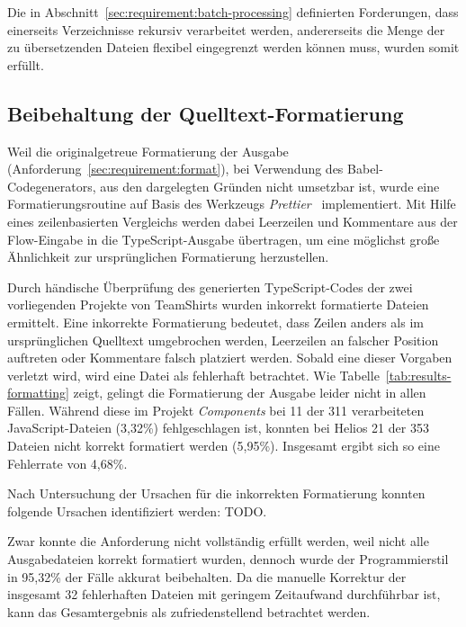 Die in Abschnitt~\ref{sec:requirement:batch-processing} definierten Forderungen, dass einerseits Verzeichnisse rekursiv verarbeitet werden, andererseits die Menge der zu übersetzenden Dateien flexibel eingegrenzt werden können muss, wurden somit erfüllt.

\subsection{Beibehaltung der Quelltext-Formatierung}

Weil die originalgetreue Formatierung der Ausgabe (Anforderung~\ref{sec:requirement:format}), bei Verwendung des Babel-Codegenerators, aus den dargelegten Gründen nicht umsetzbar ist, wurde eine Formatierungsroutine auf Basis des Werkzeugs \textit{Prettier}~\autocite{SOFTWARE:PRETTIER} implementiert. Mit Hilfe eines zeilenbasierten Vergleichs werden dabei Leerzeilen und Kommentare aus der Flow-Eingabe in die TypeScript-Ausgabe übertragen, um eine möglichst große Ähnlichkeit zur ursprünglichen Formatierung herzustellen.

Durch händische Überprüfung des generierten TypeScript-Codes der zwei vorliegenden Projekte von TeamShirts wurden inkorrekt formatierte Dateien ermittelt. Eine inkorrekte Formatierung bedeutet, dass Zeilen anders als im ursprünglichen Quelltext umgebrochen werden, Leerzeilen an falscher Position auftreten oder Kommentare falsch platziert werden. Sobald eine dieser Vorgaben verletzt wird, wird eine Datei als fehlerhaft betrachtet. Wie Tabelle~\ref{tab:results-formatting} zeigt, gelingt die Formatierung der Ausgabe leider nicht in allen Fällen. Während diese im Projekt \textit{Components} bei 11 der 311 verarbeiteten JavaScript-Dateien (3,32\%) fehlgeschlagen ist, konnten bei Helios 21 der 353 Dateien nicht korrekt formatiert werden (5,95\%). Insgesamt ergibt sich so eine Fehlerrate von 4,68\%.

\bigbreak


Nach Untersuchung der Ursachen für die inkorrekten Formatierung konnten folgende Ursachen identifiziert werden: TODO.

Zwar konnte die Anforderung nicht vollständig erfüllt werden, weil nicht alle Ausgabedateien korrekt formatiert wurden, dennoch wurde der Programmierstil in 95,32\% der Fälle akkurat beibehalten. Da die manuelle Korrektur der insgesamt 32 fehlerhaften Dateien mit geringem Zeitaufwand durchführbar ist, kann das Gesamtergebnis als zufriedenstellend betrachtet werden.
